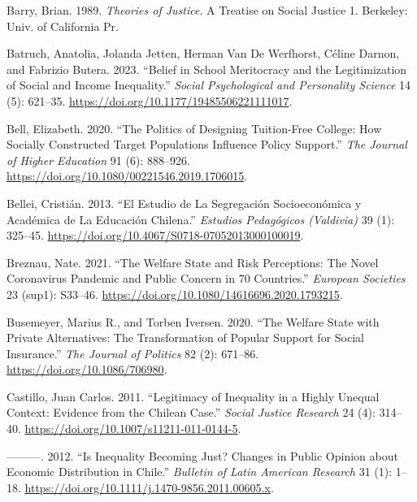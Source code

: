 \documentclass[
]{article}
\newlength{\cslhangindent}
\newenvironment{CSLReferences}[2] %
 {\begin{list}{}{%
  \setlength{\itemindent}{0pt}
  \setlength{\leftmargin}{0pt}
  \setlength{\parsep}{0pt}
  \ifodd #1
   \setlength{\leftmargin}{\cslhangindent}
   \setlength{\itemindent}{-1\cslhangindent}
  \fi
  \setlength{\itemsep}{#2\baselineskip}}}
 {\end{list}}
\begin{document}
\label{refs}
\begin{CSLReferences}{1}{0}
Barry, Brian. 1989. \emph{Theories of Justice}. A Treatise on Social
Justice 1. Berkeley: Univ. of California Pr.

Batruch, Anatolia, Jolanda Jetten, Herman Van De Werfhorst, Céline
Darnon, and Fabrizio Butera. 2023. {``Belief in {School Meritocracy} and
the {Legitimization} of {Social} and {Income Inequality}.''}
\emph{Social Psychological and Personality Science} 14 (5): 621--35.
\url{https://doi.org/10.1177/19485506221111017}.

Bell, Elizabeth. 2020. {``The {Politics} of {Designing Tuition-Free
College}: {How Socially Constructed Target Populations Influence Policy
Support}.''} \emph{The Journal of Higher Education} 91 (6): 888--926.
\url{https://doi.org/10.1080/00221546.2019.1706015}.

Bellei, Cristián. 2013. {``El Estudio de La Segregaci{ó}n
Socioecon{ó}mica y Acad{é}mica de La Educaci{ó}n Chilena.''}
\emph{Estudios Pedag{ó}gicos (Valdivia)} 39 (1): 325--45.
\url{https://doi.org/10.4067/S0718-07052013000100019}.

Breznau, Nate. 2021. {``The Welfare State and Risk Perceptions: The
{Novel Coronavirus Pandemic} and Public Concern in 70 Countries.''}
\emph{European Societies} 23 (sup1): S33--46.
\url{https://doi.org/10.1080/14616696.2020.1793215}.

Busemeyer, Marius R., and Torben Iversen. 2020. {``The {Welfare State}
with {Private Alternatives}: {The Transformation} of {Popular Support}
for {Social Insurance}.''} \emph{The Journal of Politics} 82 (2):
671--86. \url{https://doi.org/10.1086/706980}.

Castillo, Juan Carlos. 2011. {``Legitimacy of {Inequality} in a {Highly
Unequal Context}: {Evidence} from the {Chilean Case}.''} \emph{Social
Justice Research} 24 (4): 314--40.
\url{https://doi.org/10.1007/s11211-011-0144-5}.

---------. 2012. {``Is {Inequality Becoming Just}? {Changes} in {Public
Opinion} about {Economic Distribution} in {Chile}.''} \emph{Bulletin of
Latin American Research} 31 (1): 1--18.
\url{https://doi.org/10.1111/j.1470-9856.2011.00605.x}.


\end{CSLReferences}
\end{document}
